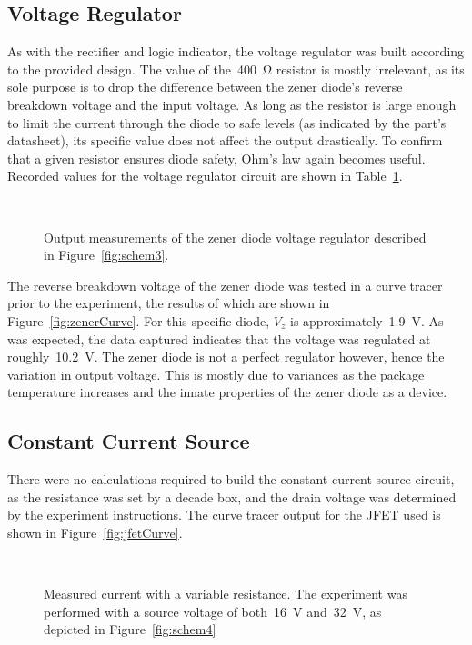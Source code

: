 \subsection{Voltage Regulator}
As with the rectifier and logic indicator, the voltage regulator was built
according to the provided design.  The value of the~\SI{400}{\ohm} resistor is
mostly irrelevant, as its sole purpose is to drop the difference between the
zener diode's reverse breakdown voltage and the input voltage.  As long as the
resistor is large enough to limit the current through the diode to safe levels
(as indicated by the part's datasheet), its specific value does not affect the
output drastically.  To confirm that a given resistor ensures diode safety,
Ohm's law again becomes useful.  Recorded values for the voltage regulator
circuit are shown in Table~\ref{tab:ckt3data}.
%
\begin{figure}[H]
	\centering
	\\
	\parbox{4.5in}{
	\caption{Output measurements of the zener diode voltage
		regulator described in Figure~\ref{fig:schem3}.}
	\label{tab:ckt3data}}
\end{figure}
%
The reverse breakdown voltage of the zener diode was tested in a curve tracer
prior to the experiment, the results of which are shown in
Figure~\ref{fig:zenerCurve}.  For this specific diode, $V_z$ is
approximately~\SI{1.9}{\volt}.  As was expected, the data captured indicates
that the voltage was regulated at roughly~\SI{10.2}{\volt}.  The zener diode is
not a perfect regulator however, hence the variation in output voltage.  This
is mostly due to variances as the package temperature increases and the innate
properties of the zener diode as a device.

\subsection{Constant Current Source}
There were no calculations required to build the constant current source
circuit, as the resistance was set by a decade box, and the drain voltage was
determined by the experiment instructions.  The curve tracer output for the
JFET used is shown in Figure~\ref{fig:jfetCurve}.
%
\begin{figure}[H]
	\centering
	\\
	\parbox{4.5in}{
	\caption{Measured current with a variable resistance.  The experiment was
		performed with a source voltage of both~\SI{16}{\volt}
		and~\SI{32}{\volt}, as depicted in Figure~\ref{fig:schem4}}
	\label{tab:ckt4data}}
\end{figure}
